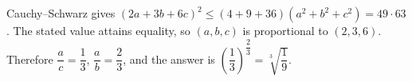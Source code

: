 Cauchy--Schwarz gives $(2a+3b+6c)^2\le(4+9+36)(a^2+b^2+c^2)=49\cdot63$. The stated value attains equality, so $(a,b,c)$ is proportional to $(2,3,6)$. Therefore $\dfrac{a}{c}=\dfrac{1}{3}$, $\dfrac{a}{b}=\dfrac{2}{3}$, and the answer is $\boxed{(\dfrac{1}{3})^{\dfrac{2}{3}}=\sqrt[3]{\dfrac{1}{9}}}$.
